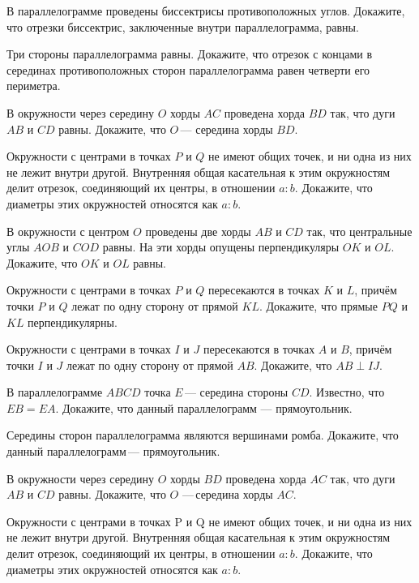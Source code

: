 \begin{class}[number=6]
	\begin{listofex}
		\item В параллелограмме проведены биссектрисы противоположных углов. Докажите, что отрезки биссектрис, заключенные внутри параллелограмма, равны.
		\item Три стороны параллелограмма равны. Докажите, что отрезок с концами в серединах противоположных сторон параллелограмма равен четверти его периметра.
		\item В окружности через середину \( O \) хорды \( AC \) проведена хорда \( BD \) так, что дуги \( AB \) и \( CD \) равны. Докажите, что \( O \) --- середина хорды \( BD \).
		\item Окружности с центрами в точках \( P \) и \( Q \) не имеют общих точек, и ни одна из них не лежит внутри другой. Внутренняя общая касательная к этим окружностям делит отрезок, соединяющий их центры, в отношении \( a:b \). Докажите, что диаметры этих окружностей относятся как \( a:b \).
		\item В окружности с центром \( O \) проведены две хорды \( AB \) и \( CD \) так, что центральные углы \( AOB \) и \( COD \) равны. На эти хорды опущены перпендикуляры \( OK \) и \( OL \). Докажите, что \( OK \) и \( OL \) равны.
		\item Окружности с центрами в точках \( P \) и \( Q \) пересекаются в точках \( K \) и \( L \), причём точки \( P \) и \( Q \) лежат по одну сторону от прямой \( KL \). Докажите, что прямые \( PQ \) и \( KL \) перпендикулярны.
		\item Окружности с центрами в точках \( I \) и \( J \) пересекаются в точках \( A \) и \( B \), причём точки \( I \) и \( J \) лежат по одну сторону от прямой \( AB \). Докажите, что \( AB\perp IJ \).
	\end{listofex}
\end{class}

\begin{homework}[number=3]
	\begin{listofex}
		\item В параллелограмме \( ABCD \) точка \( E \) --- середина стороны \( CD \). Известно, что \( EB=EA \). Докажите, что данный параллелограмм --- прямоугольник.
		\item Середины сторон параллелограмма являются вершинами ромба. Докажите, что данный параллелограмм --- прямоугольник.
		\item В окружности через середину \( O \) хорды \( BD \) проведена хорда \( AC \) так, что дуги \( AB \) и \( CD \) равны. Докажите, что \( O \) --- середина хорды \( AC \).
		\item Окружности с центрами в точках P  и Q  не имеют общих точек, и ни одна
		из них не лежит внутри другой. Внутренняя общая касательная к этим окружностям делит отрезок, соединяющий их центры, в отношении \( a:b \). Докажите, что диаметры этих окружностей относятся как \( a:b \).
	\end{listofex}
\end{homework}

